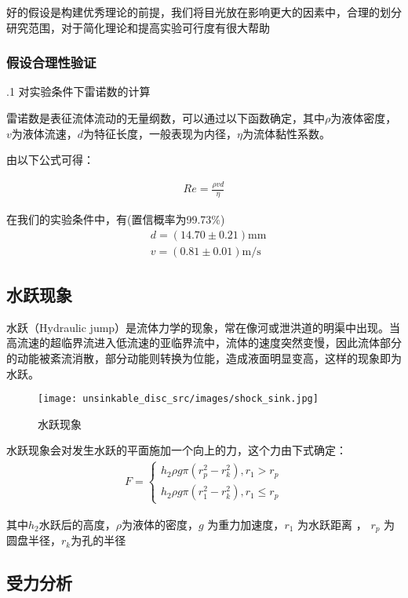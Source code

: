 \documentclass[UTF8]{gapd}
\begin{document}
好的假设是构建优秀理论的前提，我们将目光放在影响更大的因素中，合理的划分研究范围，对于简化理论和提高实验可行度有很大帮助
\subsubsection{假设合理性验证}

\noindent .1  对实验条件下雷诺数的计算

雷诺数是表征流体流动的无量纲数，可以通过以下函数确定，其中$\rho$为液体密度，$v$为液体流速，$d$为特征长度，一般表现为内径，$\eta$为流体黏性系数。

由以下公式可得：

\begin{align}
    Re=\frac{\rho vd}{\eta}
\end{align}

在我们的实验条件中，有(置信概率为99.73\%)
\begin{align}
    &d=(14.70 \pm 0.21)\text{mm}\\
    &v=(0.81 \pm 0.01)\text{m/s}
\end{align}
\subsection{水跃现象}
水跃（Hydraulic jump）是流体力学的现象，常在像河或泄洪道的明渠中出现。当高流速的超临界流进入低流速的亚临界流中，流体的速度突然变慢，因此流体部分的动能被紊流消散，部分动能则转换为位能，造成液面明显变高，这样的现象即为水跃。\cite{wiki:水跃}

\begin{figure}[!htbp]%
  \centering
  \texttt{[image: unsinkable\_disc\_src/images/shock\_sink.jpg]}
  \caption{水跃现象\cite{wiki:水跃}}
  \label{fig:unsinkable_disc_hudraulia_jump}%
\end{figure}

水跃现象会对发生水跃的平面施加一个向上的力，这个力由下式确定：
\begin{align}
    F=\begin{cases}
        h_2\rho g \pi (r_p^2-r_k^2),r_1>r_p\\
        h_2\rho g \pi (r_1^2-r_k^2),r_1\le r_p
    \end{cases} \label{eq:unsinkable_disc_core}
\end{align}

其中$h_2$水跃后的高度，$\rho$为液体的密度，$g$ 为重力加速度，$r_1$  为水跃距离 ， $r_p$ 为圆盘半径，$r_k$为孔的半径
\subsection{受力分析}
\end{document}
